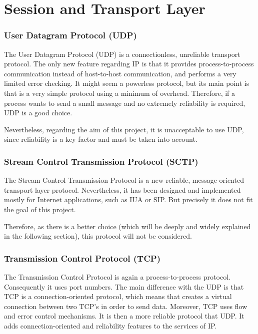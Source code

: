 %
%
%
%
%


\chapter{Session and Transport Layer}
\subsection{User Datagram Protocol (UDP)}
The User Datagram Protocol (UDP) is a connectionless, unreliable transport protocol. The only new feature regarding IP is that it provides process-to-process communication instead of host-to-host communication, and performs a very limited error checking. It might seem a powerless protocol, but its main point is that is a very simple protocol using a minimum of overhead. Therefore, if a process wants to send a small message and no extremely reliability is required, UDP is a good choice. 

Nevertheless, regarding the aim of this project, it is unacceptable to use UDP, since reliability is a key factor and must be taken into account.

\subsection{Stream Control Transmission Protocol (SCTP)}
The Stream Control Transmission Protocol is a new reliable, message-oriented transport layer protocol. Nevertheless, it has been designed and implemented mostly for Internet applications, such as IUA or SIP. But precisely it does not fit the goal of this project. 

Therefore, as there is a better choice (which will be deeply and widely explained in the following section), this protocol will not be considered. 


\subsection{ Transmission Control Protocol (TCP)}
The Transmission Control Protocol is again a process-to-process protocol. Consequently it uses port numbers. The main difference with the UDP is that TCP is a connection-oriented protocol, which means that creates a virtual connection between two TCP's in order to send data. Moreover, TCP uses flow and error control mechanisms. It is then a more reliable protocol that UDP. It adds connection-oriented and reliability features to the services of IP.

